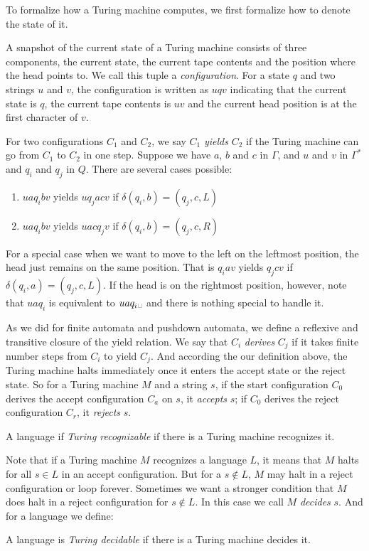 \documentclass[11pt]{article}
\begin{document}
To formalize how a Turing machine computes, we first formalize how to denote the state of it.

A snapshot of the current state of a Turing machine consists of three components, the current state,
the current tape contents and the position where the head points to. We call this tuple a
\emph{configuration}. For a state $q$ and two strings $u$ and $v$, the configuration is written as
$uqv$ indicating that the current state is $q$, the current tape contents is $uv$ and the current
head position is at the first character of $v$.

For two configurations $C_1$ and $C_2$, we say $C_1$ \emph{yields} $C_2$ if the Turing machine can
go from $C_1$ to $C_2$ in one step. Suppose we have $a$, $b$ and $c$ in $\Gamma$, and $u$ and $v$
in $\Gamma^\ast$ and $q_i$ and $q_j$ in $Q$. There are several cases possible:
\begin{enumerate}
\item $uaq_ibv$ yields $uq_jacv$ if $\delta(q_i,b)=(q_j,c,L)$
\item $uaq_ibv$ yields $uacq_jv$ if $\delta(q_i,b)=(q_j,c,R)$
\end{enumerate}

For a special case when we want to move to the left on the leftmost position, the head just remains
on the same position. That is $q_iav$ yields $q_jcv$ if $\delta(q_i,a)=(q_j,c,L)$. If the head is
on the rightmost position, however, note that $uaq_i$ is equivalent to
$uaq_i\text{\textvisiblespace}$ and there is nothing special to handle it.

As we did for finite automata and pushdown automata, we define a reflexive and transitive closure
of the yield relation. We say that $C_i$ \emph{derives} $C_j$ if it takes finite number steps from
$C_i$ to yield $C_j$. And according the our definition above, the Turing machine halts immediately
once it enters the accept state or the reject state. So for a Turing machine $M$ and a string $s$,
if the start configuration $C_0$ derives the accept configuration $C_a$ on $s$, it \emph{accepts}
$s$; if $C_0$ derives the reject configuration $C_r$, it \emph{rejects} $s$.

\begin{definition}
A language if \emph{Turing recognizable} if there is a Turing machine recognizes it.
\end{definition}

Note that if a Turing machine $M$ recognizes a language $L$, it means that $M$ halts for all
$s \in L$ in an accept configuration. But for a $s \not\in L$, $M$ may halt in a reject
configuration or loop forever. Sometimes we want a stronger condition that $M$ does halt in a reject
configuration for $s \not\in L$. In this case we call $M$ \emph{decides} $s$. And for a language we
define:

\begin{definition}
A language is \emph{Turing decidable} if there is a Turing machine decides it.
\end{definition}
\end{document}

